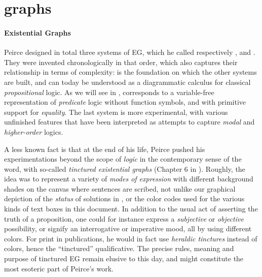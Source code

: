 \section{ graphs}

\paragraph{Existential Graphs}

Peirce designed in total three systems of EG, which he called respectively
,  and . They were invented chronologically in
that order, which also captures their relationship in terms of complexity:
 is the foundation on which the other systems are built, and can
today be understood as a diagrammatic calculus for classical
\emph{propositional} logic. As we will see in , 
corresponds to a variable-free representation of \emph{predicate} logic without
function symbols, and with primitive support for \emph{equality}. The last
system  is more experimental, with various unfinished features that
have been interpreted as attempts to capture \emph{modal}
 and \emph{higher-order} logics.

\begin{digression}
A less known fact is that at the end of his life, Peirce pushed his
experimentations beyond the scope of \emph{logic} in the contemporary sense of
the word, with so-called \emph{tinctured existential graphs} (Chapter 6 in
\cite{Roberts+1973}). Roughly, the idea was to represent a variety of
\emph{modes of expression} with different background shades on the canvas where
sentences are scribed, not unlike our graphical depiction of the \emph{status}
of solutions in , or the color codes used for the various
kinds of text boxes in this document. In addition to the usual act of asserting
the truth of a proposition, one could for instance express a \emph{subjective}
or \emph{objective} possibility, or signify an interrogative or imperative mood,
all by using different colors. For print in publications, he would in fact use
\emph{heraldic tinctures} instead of colors, hence the ``tinctured''
qualificative. The precise rules, meaning and purpose of tinctured EG remain
elusive to this day, and might constitute the most esoteric part of Peirce's
work.
\end{digression}

